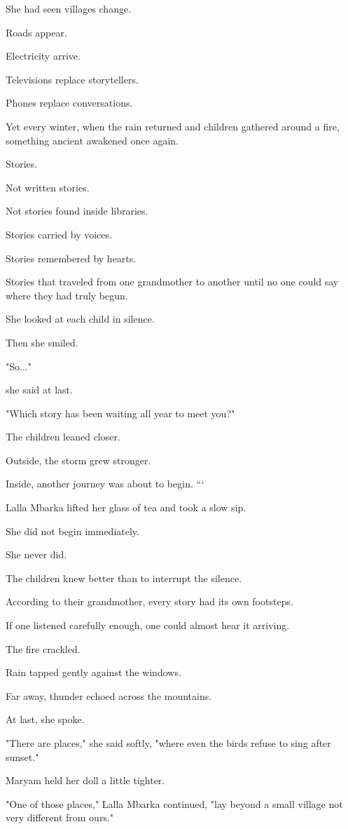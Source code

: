 \documentclass[12pt,openany]{book}
\begin{document}
She had seen villages change.

Roads appear.

Electricity arrive.

Televisions replace storytellers.

Phones replace conversations.

Yet every winter, when the rain returned and children gathered around a fire, something ancient awakened once again.

Stories.

Not written stories.

Not stories found inside libraries.

Stories carried by voices.

Stories remembered by hearts.

Stories that traveled from one grandmother to another until no one could say where they had truly begun.

She looked at each child in silence.

Then she smiled.

"So..."

she said at last.

"Which story has been waiting all year to meet you?"

The children leaned closer.

Outside, the storm grew stronger.

Inside, another journey was about to begin.
```

Lalla Mbarka lifted her glass of tea and took a slow sip.

She did not begin immediately.

She never did.

The children knew better than to interrupt the silence.

According to their grandmother, every story had its own footsteps.

If one listened carefully enough, one could almost hear it arriving.

The fire crackled.

Rain tapped gently against the windows.

Far away, thunder echoed across the mountains.

At last, she spoke.

"There are places," she said softly, "where even the birds refuse to sing after sunset."

Maryam held her doll a little tighter.

"One of those places," Lalla Mbarka continued, "lay beyond a small village not very different from ours."
\end{document}
